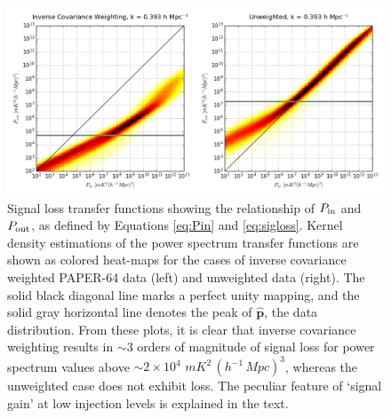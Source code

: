 \documentclass[preprint2,numberedappendix,tighten]{aastex6}  %
\begin{document}

\begin{figure}
	\centering
	\includegraphics[width=1\textwidth]{plots/sigloss_transfercurve.png}
	\caption{Signal loss transfer functions showing the relationship of $P_{\rm in}$ and $P_{\rm out}$, as defined by Equations 
\eqref{eq:Pin} and \eqref{eq:sigloss}. Kernel density estimations of the power spectrum transfer functions are shown as colored 
heat-maps for the cases of inverse covariance weighted PAPER-64 data (left) and unweighted data (right). The solid black 
diagonal line marks a perfect unity mapping, and the solid gray horizontal line denotes the peak of $\hat{\textbf{p}}$, the data 
distribution. From these plots, it is clear that inverse covariance weighting results in $\sim3$ orders of magnitude of signal loss 
for power spectrum values above $\sim$$2 \times 10^{4}$ $mK^{2} \, (h^{-1} \, Mpc)^{3}$, whereas the unweighted case does 
not exhibit loss. The peculiar feature of `signal gain' at low injection levels is explained in the text.}
	\label{fig:sigloss_transfercurve}
\end{figure}
\end{document}
